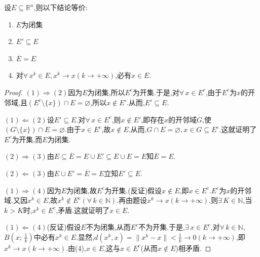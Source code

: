\documentclass[../../main.tex]{subfiles}%
\begin{document}
\begin{theorem}\label{theorem:Rn中闭集的充要条件}
设$E\subseteq\mathbb{R}^n$,则以下结论等价:
\begin{enumerate}[(1)]
\item $E$为闭集

\item\label{theorem:Rn中闭集的充要条件-2} $E'\subseteq E$

\item $\overline{E}=E$

\item\label{theorem:Rn中闭集的充要条件-4} 对$\forall\,x^k\in E,x^k\to x(k\to+\infty)$,必有$x\in E$.
\end{enumerate}
\end{theorem}
\begin{proof}
$(1)\Rightarrow(2)$因为$E$为闭集,所以$E^c$为开集.于是,对$\forall\,x\in E^c$,由于$E^c$为$x$的开邻域,且$(E^c\setminus\{x\})\cap E=\varnothing$,所以$x\notin E'$.从而,$E'\subseteq E$.

$(1)\Leftarrow(2)$设$E'\subseteq E$.对$\forall\,x\in E^c$,则$x\notin E'$,即存在$x$的开邻域$G$,使$(G\setminus\{x\})\cap E=\varnothing$.由于$x\in E^c$,故$x\notin E$.从而,$G\cap E=\varnothing,x\in G\subseteq E^c$.这就证明了$E^c$为开集,而$E$为闭集.

$(2)\Rightarrow(3)$由$E\subseteq\overline{E}=E\cup E'\subseteq E\cup E=E$知$\overline{E}=E$.

$(2)\Leftarrow(3)$由$E\cup E'=\overline{E}=E$立知$E'\subseteq E$.

$(1)\Rightarrow(4)$因为$E$为闭集,故$E^c$为开集.(反证)假设$x\notin E$,即$x\in E^c$.$E^c$为$x$的开邻域.又因$x^k\in E$,故$x^k\notin E^c(\forall\,k\in\mathbb{N})$.再由题设$x^k\to x(k\to+\infty)$,则$\exists\,K\in\mathbb{N}$,当$k>K$时,$x^k\in E^c$,矛盾.这就证明了$x\in E$.

$(1)\Leftarrow(4)$(反证)假设$E$不为闭集,从而$E^c$不为开集.于是,$\exists\,x\in E^c$,对$\forall\,k\in\mathbb{N}$,$B\left(x;\,\frac{1}{k}\right)$中必有$x^k\in E$.显然,$d(x^k,x)=\|x^k-x\|<\frac{1}{k}\to0(k\to+\infty)$,即$x^k\to x(k\to+\infty)$.由(4),$x\in E$,这与$x\in E^c$(从而$x\notin E$)相矛盾.
\end{proof}
\end{document}
